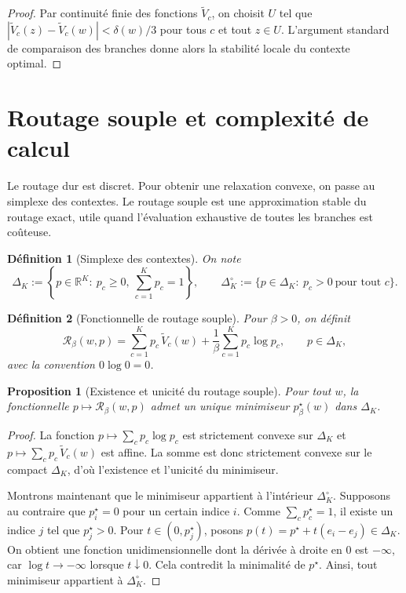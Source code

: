 \documentclass[11pt,a4paper]{article}
\newtheorem{definition}{Définition}[section]
\newtheorem{proposition}{Proposition}[section]
\newcommand{\R}{\mathbb R}
\newcommand{\Rcal}{\mathcal R}
\begin{document}
\begin{proof}
Par continuité finie des fonctions \(\widetilde V_c\), on choisit \(U\) tel que \(|\widetilde V_c(z)-\widetilde V_c(w)|<\delta(w)/3\) pour tous \(c\) et tout \(z\in U\). L'argument standard de comparaison des branches donne alors la stabilité locale du contexte optimal.
\end{proof}

\section{Routage souple et complexité de calcul}

Le routage dur est discret. Pour obtenir une relaxation convexe, on passe au simplexe des contextes. Le routage souple est une approximation stable du routage exact, utile quand l'évaluation exhaustive de toutes les branches est coûteuse.

\begin{definition}[Simplexe des contextes]
On note
\[
\Delta_K:=\left\{p\in\R^K:\ p_c\ge 0,\ \sum_{c=1}^K p_c=1\right\},
\qquad
\Delta_K^\circ:=\{p\in\Delta_K:\ p_c>0\ \text{pour tout }c\}.
\]
\end{definition}

\begin{definition}[Fonctionnelle de routage souple]
Pour \(\beta>0\), on définit
\[
\Rcal_\beta(w,p)
=
\sum_{c=1}^K p_c\,\widetilde V_c(w)
+\frac{1}{\beta}\sum_{c=1}^K p_c\log p_c,
\qquad p\in\Delta_K,
\]
avec la convention \(0\log 0=0\).
\end{definition}

\begin{proposition}[Existence et unicité du routage souple]
Pour tout \(w\), la fonctionnelle \(p\mapsto \Rcal_\beta(w,p)\) admet un unique minimiseur \(p^\star_\beta(w)\) dans \(\Delta_K\).
\end{proposition}

\begin{proof}
La fonction \(p\mapsto \sum_c p_c\log p_c\) est strictement convexe sur \(\Delta_K\) et \(p\mapsto \sum_c p_c\,\widetilde V_c(w)\) est affine. La somme est donc strictement convexe sur le compact \(\Delta_K\), d'où l'existence et l'unicité du minimiseur.

Montrons maintenant que le minimiseur appartient à l'intérieur \(\Delta_K^\circ\). Supposons au contraire que \(p^\star_i=0\) pour un certain indice \(i\). Comme \(\sum_c p^\star_c=1\), il existe un indice \(j\) tel que \(p^\star_j>0\). Pour \(t\in(0,p^\star_j)\), posons \(p(t)=p^\star+t(e_i-e_j)\in\Delta_K\). On obtient une fonction unidimensionnelle dont la dérivée à droite en \(0\) est \(-\infty\), car \(\log t\to-\infty\) lorsque \(t\downarrow 0\). Cela contredit la minimalité de \(p^\star\). Ainsi, tout minimiseur appartient à \(\Delta_K^\circ\).
\end{proof}
\end{document}
